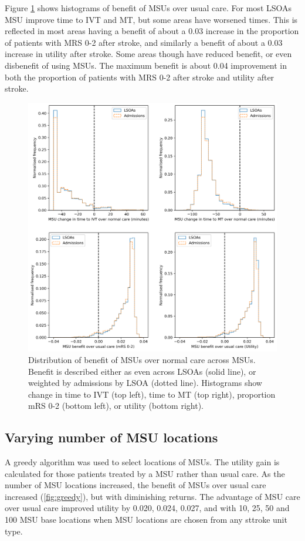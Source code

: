 Figure \ref{fig:msu_histograms} shows histograms of benefit of MSUs over usual care. For most LSOAs MSU improve time to IVT and MT, but some areas have worsened times. This is reflected in most areas having a benefit of about a 0.03 increase in the proportion of patients with MRS 0-2 after stroke, and similarly a benefit of about a 0.03 increase in utility after stroke. Some areas though have reduced benefit, or even disbenefit of using MSUs. The maximum benefit is about 0.04 improvement in both the proportion of patients with MRS 0-2 after stroke and utility after stroke.

\begin{figure}[h]
    \centering
    \includegraphics[width=0.75\linewidth]{images/histograms.png}
    \caption{Distribution of benefit of MSUs over normal care across MSUs. Benefit is described either as even across LSOAs (solid line), or weighted by admissions by LSOA (dotted line). Histograms show change in time to IVT (top left), time to MT (top right), proportion mRS 0-2 (bottom left), or utility (bottom right).}
    \label{fig:msu_histograms}
\end{figure}

\subsection{Varying number of MSU locations}

A greedy algorithm was used to select locations of MSUs. The utility gain is calculated for those patients treated by a MSU rather than usual care. As the number of MSU locations increased, the benefit of MSUs over usual care increased (\ref{fig:greedy}), but with diminishing returns. The advantage of MSU care over usual care improved utility by 0.020, 0.024, 0.027, and  with 10, 25, 50 and 100 MSU base locations when MSU locations are chosen from any sttroke unit type. 

